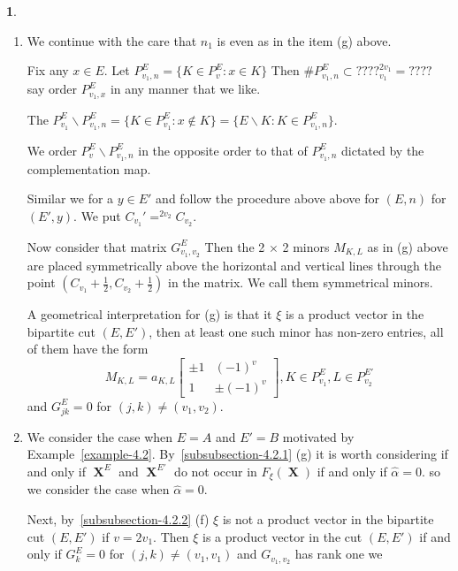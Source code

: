 \documentclass[a4paper,12pt]{article}
\DeclareMathOperator{\x}{\mathrm{X}}
\theoremstyle{definition}
\theoremstyle{underlinethm}
\theoremstyle{definition}
\newtheorem{subsubsec}{}[subsection]
\begin{document}
\begin{subsubsec}
\begin{enumerate}[label=(\alph*)]
\item We continue with the care that $n_{1}$ is even as in the item (g) above.

Fix any $x\in E$. Let $P_{v_{1}, n}^{E} = \{K \in P_{v}^{E} : x\in K\}$ Then $\# P_{v_{1}, n}^{E} \subset ????_{v_{1}}^{2v_{1}} = ????$ say order $P_{v_{1}, x}^{E}$ in any manner that we like.

The $P_{v_{1}}^{E} \smallsetminus P_{v_{1}, n}^{E} = \{K \in P_{v_{1}}^{E} : x \notin K\} = \{E \smallsetminus K : K \in P_{v_{1}, n}^{E}\}$.

We order $P_{v}^{E} \smallsetminus P_{v_{1}, n}^{E}$ in the opposite order to that of $P_{v_{1}, n}^{E}$ dictated by the complementation map.

Similar we for a $y \in E'$ and follow the procedure above above for $(E, n)$ for $(E', y)$. We put $C_{v_{1}}' = ^{2v_{2}}C_{v_{2}}$. 

Now consider that matrix $G_{v_{1}, v_{2}}^{E}$ Then the 2 $\times$ 2 minors $M_{K,L}$ as in (g) above are placed symmetrically above the horizontal and vertical lines through the point $(C_{v_{1}} + \frac{1}{2}, C_{v_{2}} + \frac{1}{2})$ in the matrix. We call them symmetrical minors.

A geometrical interpretation for (g) is that it $\xi$ is a product vector  in the bipartite cut $(E, E')$, then at least one such minor has non-zero entries, all of them have the form
$$
M_{K, L} = a_{K, L}\begin{bmatrix}\pm 1 & (-1)^{v}\\ 1 & \pm (-1)^{v} \end{bmatrix}, K \in P_{v_{1}}^{E}, L \in P_{v_{2}}^{E'}
$$ 
and $G_{j k}^{E}=0$ for $(j,k) \neq (v_{1}, v_{2})$.

\item We consider the case when $E = A$ and $E'=B$ motivated by Example~\ref{example-4.2}. By~\eqref{subsubsection-4.2.1} (g) it is worth considering if and only if $\boldsymbol{\x}^{E}$ and $\boldsymbol{\x}^{E'}$ do not occur in $F_{\xi}(\boldsymbol{\x})$ if and only if $\hat{\alpha} =0$. so we consider the case when $\hat{\alpha}=0$.

Next, by~\eqref{subsubsection-4.2.2} (f) $\xi$ is not a product vector in the bipartite cut $(E, E')$ if $v=2v_{1}$. Then $\xi$ is a product vector in the cut $(E, E')$ if and only if $G_{k}^{E}=0$ for $(j, k)\neq (v_{1}, v_{1})$ and $G_{v_{1}, v_{2}}$ has rank one we  

\end{enumerate}

\end{subsubsec}
\end{document}
